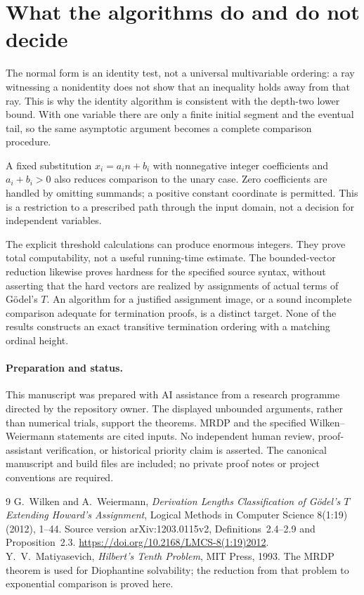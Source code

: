 \documentclass[11pt]{article}
\begin{document}
\section{What the algorithms do and do not decide}
The normal form is an identity test, not a universal multivariable
ordering: a ray witnessing a nonidentity does not show that an inequality
holds away from that ray. This is why the identity algorithm is
consistent with the depth-two lower bound. With one variable there
are only a finite initial segment and the eventual tail, so the same
asymptotic argument becomes a complete comparison procedure.

A fixed substitution $x_i=a_i n+b_i$ with nonnegative integer
coefficients and $a_i+b_i>0$ also reduces comparison to the unary case.
Zero coefficients are handled by omitting summands; a positive constant
coordinate is permitted. This is a restriction to a prescribed path
through the input domain, not a decision for independent variables.

The explicit threshold calculations can produce enormous integers.
They prove total computability, not a useful running-time estimate.
The bounded-vector reduction likewise proves hardness for the specified
source syntax, without asserting that the hard vectors are realized by
assignments of actual terms of G\"odel's $T$. An algorithm for a justified
assignment image, or a sound incomplete comparison adequate for
termination proofs, is a distinct target. None of the results constructs
an exact transitive termination ordering with a matching ordinal height.

\paragraph{Preparation and status.}
This manuscript was prepared with AI assistance from a research programme
directed by the repository owner. The displayed unbounded arguments,
rather than numerical trials, support the theorems. MRDP and the
specified Wilken--Weiermann statements are cited inputs. No independent
human review, proof-assistant verification, or historical priority claim
is asserted. The canonical manuscript and build files are included;
no private proof notes or project conventions are required.

\begin{thebibliography}{9}
 G.~Wilken and A.~Weiermann,
\emph{Derivation Lengths Classification of G\"odel's $T$ Extending
Howard's Assignment}, Logical Methods in Computer Science 8(1:19)
(2012), 1--44. Source version arXiv:1203.0115v2,
Definitions~2.4--2.9 and Proposition~2.3.
\url{https://doi.org/10.2168/LMCS-8(1:19)2012}.
 Y.~V.~Matiyasevich,
\emph{Hilbert's Tenth Problem}, MIT Press, 1993.
The MRDP theorem is used for Diophantine solvability; the reduction
from that problem to exponential comparison is proved here.
\end{thebibliography}
\end{document}
